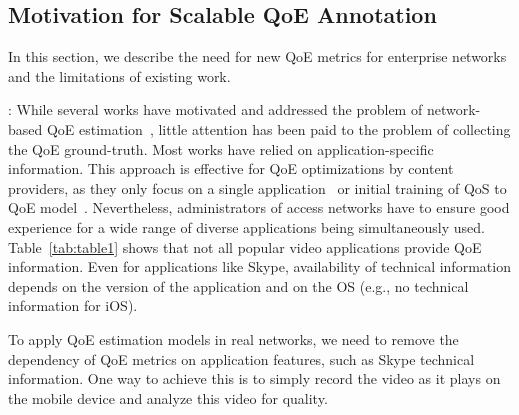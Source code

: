 \subsection{Motivation for Scalable QoE Annotation} \label{MOTIVATION}

In this section, we describe the need for new QoE metrics for enterprise networks and the limitations of existing work. 

:
While several works have motivated and addressed the problem of network-based QoE estimation~\cite{aggarwal2014prometheus}, little attention has been paid to the problem of collecting the QoE ground-truth. Most works have relied on application-specific information. This approach is effective for QoE optimizations by content providers, as they only focus on a single application~\cite{balachandran2013developing} or initial training of QoS to QoE model~\cite{aggarwal2014prometheus}. Nevertheless, administrators of access networks have to ensure good experience for a wide range of diverse applications being simultaneously used. 
Table~\ref{tab:table1} shows that not all popular video applications provide QoE information. 
Even for applications like Skype, availability of technical information depends on the version of the application and on the OS (e.g., no technical information for iOS). 

\begin{table}[htb!]
	\centering
		\scriptsize
			\vspace*{-0.5em}	
        \vspace*{0.2em}
		\hfill 
		\caption{Availability of QoE ground-truth}
		\label{tab:table1} 
\end{table}

To apply QoE estimation models in real networks, we need to remove the dependency of QoE metrics on application features, such as Skype technical information. One way to achieve this is to simply record the video as it plays on the mobile device and analyze this video for quality. 

